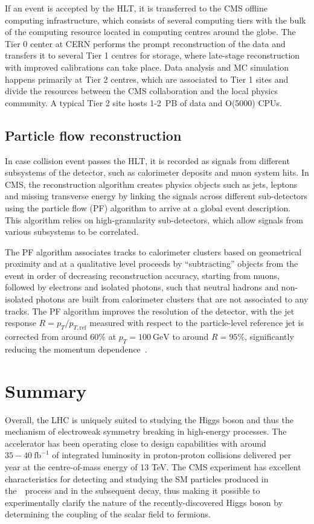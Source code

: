 If an event is accepted by the HLT, it is transferred to the CMS offline computing infrastructure, which consists of several computing tiers with the bulk of the computing resource located in computing centres around the globe. The Tier 0 center at CERN performs the prompt reconstruction of the data and transfers it to several Tier 1 centres for storage, where late-stage reconstruction with improved calibrations can take place. Data analysis and MC simulation happens primarily at Tier 2 centres, which are associated to Tier 1 sites and divide the resources between the CMS collaboration and the local physics community. A typical Tier 2 site hosts 1-2~PB of data and O(5000) CPUs.

\subsection{Particle flow reconstruction}
\label{sec:particleflow}
In case collision event passes the HLT, it is recorded as signals from different subsystems of the detector, such as calorimeter deposits and muon system hits. In CMS, the reconstruction algorithm creates physics objects such as jets, leptons and missing transverse energy by linking the signals across different sub-detectors using the particle flow (PF) algorithm to arrive at a global event description. This algorithm relies on high-granularity sub-detectors, which allow signals from various subsystems to be correlated. 

The PF algorithm associates tracks to calorimeter clusters based on geometrical proximity and at a qualitative level proceeds by ``subtracting'' objects from the event in order of decreasing reconstruction accuracy, starting from muons, followed by electrons and isolated photons, such that neutral hadrons and non-isolated photons are built from calorimeter clusters that are not associated to any tracks. The PF algorithm improves the resolution of the detector, with the jet response $R = p_T / p_{T,\mathrm{ref}}$ measured with respect to the particle-level reference jet is corrected from around 60\% at $p_T = 100~\mathrm{GeV}$ to around $R=95\%$, significantly reducing the momentum dependence~\cite{cms_particleflow:2017}.

\section{Summary}
Overall, the LHC is uniquely suited to studying the Higgs boson and thus the mechanism of electroweak symmetry breaking in high-energy processes. The accelerator has been operating close to design capabilities with around $35-40~\mathrm{fb}^{-1}$ of integrated luminosity in proton-proton collisions delivered per year at the centre-of-mass energy of 13 TeV. The CMS experiment has excellent characteristics for detecting and studying the SM particles produced in the~\ttH~process and in the subsequent decay, thus making it possible to experimentally clarify the nature of the recently-discovered Higgs boson by determining the coupling of the scalar field to fermions.

